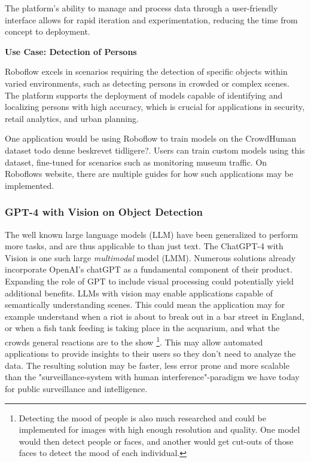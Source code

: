 The platform's ability to manage and process data through a user-friendly interface allows for rapid iteration and experimentation, reducing the time from concept to deployment.

\textbf{Use Case: Detection of Persons}

Roboflow excels in scenarios requiring the detection of specific objects within varied environments, such as detecting persons in crowded or complex scenes. The platform supports the deployment of models capable of identifying and localizing persons with high accuracy, which is crucial for applications in security, retail analytics, and urban planning.

One application would be using Roboflow to train models on the CrowdHuman dataset todo denne beskrevet tidligere?. Users can train custom models using this dataset, fine-tuned for scenarios such as monitoring museum traffic. On Roboflows website, there are multiple guides for how such applications may be implemented.

\subsubsection{GPT-4 with Vision on Object Detection}

The well known large language models (LLM) have been generalized to perform more tasks, and are thus applicable to than just text. The ChatGPT-4 with Vision is one such large \textit{multimodal} model (LMM). Numerous solutions already incorporate OpenAI's chatGPT as a fundamental component of their product. Expanding the role of GPT to include visual processing could potentially yield additional benefits. LLMs with vision may enable applications capable of semantically understanding scenes. This could mean the application may for example understand when a riot is about to break out in a bar street in England, or when a fish tank feeding is taking place in the acquarium, and what the crowds general reactions are to the show \footnote{Detecting the mood of people is also much researched and could be implemented for images with high enough resolution and quality. One model would then detect people or faces, and another would get cut-outs of those faces to detect the mood of each individual.}. This may allow automated applications to provide insights to their users so they don't need to analyze the data. The resulting solution may be faster, less error prone and more scalable than the "surveillance-system with human interference"-paradigm we have today for public surveillance and intelligence.

